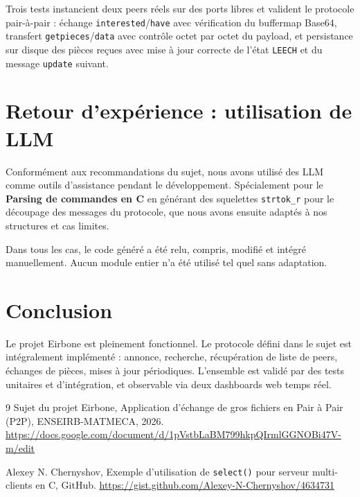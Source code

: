 \documentclass[12pt,a4paper]{article}
\begin{document}
Trois tests instancient deux peers réels sur des ports libres
et valident le protocole pair-à-pair : échange \texttt{interested}/\texttt{have}
avec vérification du buffermap Base64, transfert \texttt{getpieces}/\texttt{data}
avec contrôle octet par octet du payload, et persistance sur disque des pièces
reçues avec mise à jour correcte de l'état \texttt{LEECH} et du message
\texttt{update} suivant.
\section{Retour d'expérience : utilisation de LLM}

Conformément aux recommandations du sujet, nous avons utilisé des LLM comme outils d'assistance pendant le développement. Spécialement pour le \textbf{Parsing de commandes en C} en générant des squelettes \texttt{strtok\_r} pour le découpage des messages du protocole, que nous avons ensuite adaptés à nos structures et cas limites.

Dans tous les cas, le code généré a été relu, compris, modifié et intégré manuellement. Aucun module entier n'a été utilisé tel quel sans adaptation.

\section{Conclusion}

Le projet Eirbone est pleinement fonctionnel. Le protocole défini dans le sujet est intégralement implémenté : annonce, recherche, récupération de liste de peers, échanges de pièces, mises à jour périodiques. L'ensemble est validé par
des tests unitaires et d'intégration, et observable via deux dashboards web temps réel.
\begin{thebibliography}{9}
Sujet du projet Eirbone,
Application d'échange de gros fichiers en Pair à Pair (P2P),
ENSEIRB-MATMECA, 2026.
\url{https://docs.google.com/document/d/1pVstbLaBM799hkpQIrmlGGNOBi47V-m/edit}

Alexey N. Chernyshov,
Exemple d'utilisation de \texttt{select()} pour serveur multi-clients en C,
GitHub.
\url{https://gist.github.com/Alexey-N-Chernyshov/4634731}

\end{thebibliography}
\end{document}
